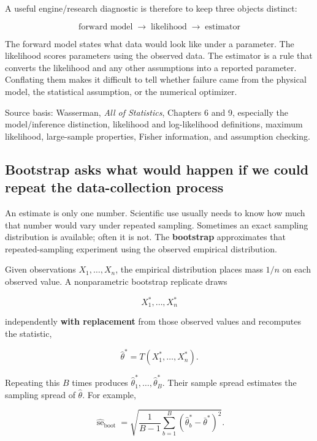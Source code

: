 A useful engine/research diagnostic is therefore to keep three objects distinct:

\[
\boxed{
\text{forward model}
\;\longrightarrow\;
\text{likelihood}
\;\longrightarrow\;
\text{estimator}
}
\]

The forward model states what data would look like under a parameter. The likelihood scores parameters using the observed data. The estimator is a rule that converts the likelihood and any other assumptions into a reported parameter. Conflating them makes it difficult to tell whether failure came from the physical model, the statistical assumption, or the numerical optimizer.

Source basis: Wasserman, \emph{All of Statistics}, Chapters 6 and 9, especially the model/inference distinction, likelihood and log-likelihood definitions, maximum likelihood, large-sample properties, Fisher information, and assumption checking.

\subsection{Bootstrap asks what would happen if we could repeat the data-collection process}\label{02-foundations-ii-ch030-bootstrap-asks-what-would-happen-if-we-could-repeat-the-data-collection-process}

\hypertarget{02-foundations-ii-ch030-bootstrap-asks-what-would-happen-if-we-could-repeat-the-data-collection-process}{}

An estimate is only one number. Scientific use usually needs to know how much that number would vary under repeated sampling. Sometimes an exact sampling distribution is available; often it is not. The \textbf{bootstrap} approximates that repeated-sampling experiment using the observed empirical distribution.

Given observations \(X_1,\ldots,X_n\), the empirical distribution places mass \(1/n\) on each observed value. A nonparametric bootstrap replicate draws

\[
X_1^*,\ldots,X_n^*
\]

independently \textbf{with replacement} from those observed values and recomputes the statistic,

\[
\hat\theta^*=T(X_1^*,\ldots,X_n^*).
\]

Repeating this \(B\) times produces \(\hat\theta_1^*,\ldots,\hat\theta_B^*\). Their sample spread estimates the sampling spread of \(\hat\theta\). For example,

\[
\widehat{\operatorname{se}}_{\mathrm{boot}}
=
\sqrt{
\frac{1}{B-1}
\sum_{b=1}^{B}
(\hat\theta_b^*-\bar{\theta}^*)^2
}.
\]

